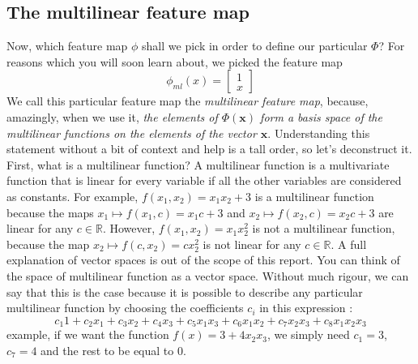 \documentclass{article}
\theoremstyle{definition}
\theoremstyle{definition}
\begin{document}
\subsection{The multilinear feature map}
Now, which feature map $\phi$ shall we pick in order to define our particular $\Phi$?
For reasons which you will soon learn about, we picked the feature map
\begin{equation}
    \phi_{ml}(x) = 
    \begin{bmatrix}
        1 \\
        x
    \end{bmatrix}
\end{equation}
We call this particular feature map the \emph{multilinear feature map}, because, amazingly, when we use it, \emph{the elements of $\Phi(\mathbf{x})$ form a basis space of the multilinear functions on the elements of the vector $\mathbf{x}$}.
Understanding this statement without a bit of context and help is a tall order, so let's deconstruct it.
First, what is a multilinear function? A multilinear function is a multivariate function that is linear for every variable if all the other variables are considered as constants. For example, $f(x_1, x_2) = x_1 x_2 + 3$ is a multilinear function because the maps $x_1 \mapsto f(x_1, c) = x_1c  + 3$ and $x_2 \mapsto f(x_2, c) = x_2c  + 3$ are linear for any $c \in \mathbb{\mathbb{R}}$. However, $f(x_1, x_2) = x_1 x_2^2$ is not a multilinear function, because the map $x_2 \mapsto f(c, x_2) = c x_2^2$ is not linear for any $c \in \mathbb{R}$. A full explanation of vector spaces is out of the scope of this report. You can think of the space of multilinear function as a vector space. Without much rigour, we can say that this is the case because it is possible to describe any particular multilinear function by choosing the coefficients $c_i$ in this expression :
\begin{equation}\label{eq:basis}
    c_1 1 + c_2 x_1 + c_3 x_2 + c_4 x_3  + c_5 x_1 x_3 + c_6 x_1 x_2 + c_7 x_2 x_3 + c_8 x_1 x_2 x_3
\end{equation}
 example, if we want the function $f(x) = 3 + 4 x_2 x_3$, we simply need $c_1 = 3$, $c_7 = 4$ and the rest to be equal to $0$.
\end{document}
